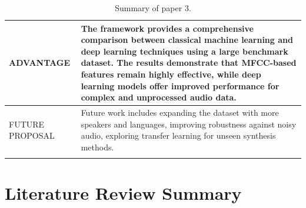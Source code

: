 \documentclass[12pt,a4paper]{report}
\begin{document}
\begin{longtable}{|p{4cm}|p{11cm}|}
ADVANTAGE &
The framework provides a comprehensive comparison between classical machine learning and deep learning techniques using a large benchmark dataset. The results demonstrate that MFCC-based features remain highly effective, while deep learning models offer improved performance for complex and unprocessed audio data. \\ \hline

FUTURE PROPOSAL &
Future work includes expanding the dataset with more speakers and languages, improving robustness against noisy audio, exploring transfer learning for unseen synthesis methods. \\ \hline

\caption[Summary of paper 3]{Summary of paper 3.}
\label{tab:paper3_summary}

\end{longtable}

\section{Literature Review Summary}


\renewcommand{\arraystretch}{1.4}
\setlength{\tabcolsep}{10pt}
\end{document}
